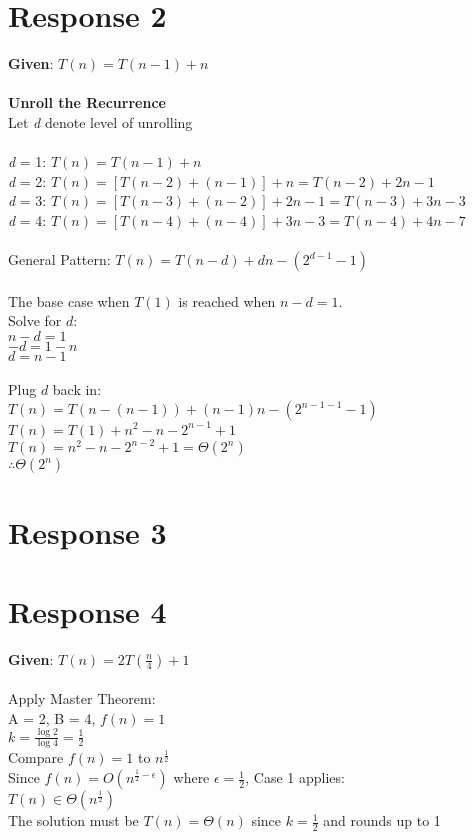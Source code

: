 \documentclass[12pt, a4paper]{article}
\begin{document}
\section*{\centering Response 2}
    \textbf{Given}: \(T(n) = T(n-1) + n\)\\
    \\
    \textbf{Unroll the Recurrence}\\
    Let \textit{d} denote level of unrolling\\
    \\
    \textit{d} = 1: \(T(n) = T(n-1) + n\)\\
    \textit{d} = 2: \(T(n) = [T(n-2) + (n-1)] + n = T(n-2) + 2n - 1\)\\
    \textit{d} = 3: \(T(n) = [T(n-3) + (n-2)] + 2n - 1 = T(n-3) + 3n - 3\)\\
    \textit{d} = 4: \(T(n) = [T(n-4) + (n-4)] + 3n - 3 = T(n-4) + 4n - 7\)\\
    \\
    General Pattern: \(T(n) = T(n-d) + dn - (2^{d-1} - 1)\)\\
    \\
    The base case when \(T(1)\) is reached when \(n-d = 1\).\\
    Solve for \(d\): \\
    \(n - d = 1\)\\
    \(-d = 1-n\)\\
    \(d=n-1\) \\
    \\
    Plug \(d\) back in:\\
    \(T(n)=T(n-(n-1))+(n-1)n-(2^{n-1-1}-1)\)\\
    \(T(n)=T(1)+n^2-n-2^{n-1}+1\)\\
    \(T(n)=n^2-n-2^{n-2}+1 = \Theta{(2^n)}\)\\
    \(\therefore \Theta{(2^n)}\)
    \newpage

\section*{\centering Response 3}

\section*{\centering Response 4}
    \textbf{Given}: \(T(n) = 2T(\frac{n}{4}) + 1\)\\
    \\
    Apply Master Theorem:\\
    A = 2, B = 4, \(f(n) = 1\)\\
    \(k = \frac{\log{2}}{\log{4}} = \frac{1}{2}\)\\
    Compare \(f(n) = 1\) to \(n^{\frac{1}{2}}\)\\
    Since \(f(n) = O(n^{\frac{1}{2} - \epsilon})\) where \(\epsilon = \frac{1}{2}\), Case 1 applies:\\
    \(T(n) \in \Theta{(n^{\frac{1}{2}})}\)\\
    The solution must be \(T(n) = \Theta{(n)}\) since \(k = \frac{1}{2}\) and rounds up to 1
\end{document}
